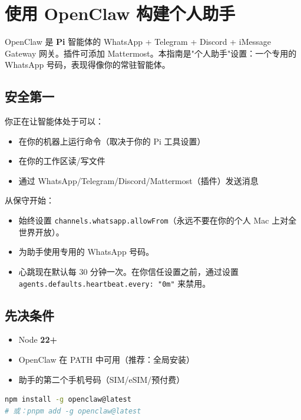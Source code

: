 \clearpage

\section{使用 OpenClaw 构建个人助手}


OpenClaw 是 \textbf{Pi} 智能体的 WhatsApp + Telegram + Discord + iMessage Gateway 网关。插件可添加 Mattermost。本指南是"个人助手"设置：一个专用的 WhatsApp 号码，表现得像你的常驻智能体。

\subsection{ 安全第一}


你正在让智能体处于可以：

\begin{itemize}
  \item 在你的机器上运行命令（取决于你的 Pi 工具设置）
  \item 在你的工作区读/写文件
  \item 通过 WhatsApp/Telegram/Discord/Mattermost（插件）发送消息
\end{itemize}


从保守开始：

\begin{itemize}
  \item 始终设置 \texttt{channels.whatsapp.allowFrom}（永远不要在你的个人 Mac 上对全世界开放）。
  \item 为助手使用专用的 WhatsApp 号码。
  \item 心跳现在默认每 30 分钟一次。在你信任设置之前，通过设置 \texttt{agents.defaults.heartbeat.every: "0m"} 来禁用。
\end{itemize}


\subsection{先决条件}


\begin{itemize}
  \item Node \textbf{22+}
  \item OpenClaw 在 PATH 中可用（推荐：全局安装）
  \item 助手的第二个手机号码（SIM/eSIM/预付费）
\end{itemize}


\begin{lstlisting}[language=bash]
npm install -g openclaw@latest
# 或：pnpm add -g openclaw@latest
\end{lstlisting}


